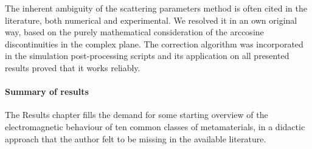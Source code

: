 The inherent ambiguity of the scattering parameters method is often cited in the literature, both numerical and experimental. We resolved it in an own original way, based on the purely mathematical consideration of the arccosine discontinuities in the complex plane. The correction algorithm was incorporated in the simulation post-processing scripts and its application on all presented results proved that it works reliably. 

\paragraph{Summary of results}
The Results chapter fills the demand for some starting overview of the electromagnetic behaviour of ten common classes of metamaterials, in a didactic approach that the author felt to be missing in the available literature. %

